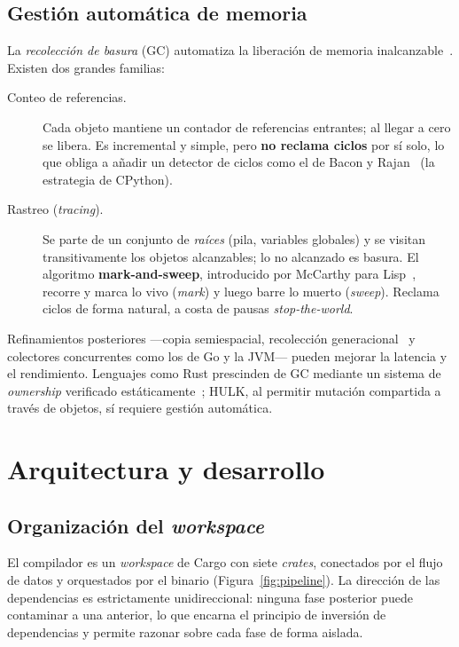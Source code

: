 \documentclass[14pts,runningheads,a4paper]{llncs}
\newcommand{\code}[1]{\texttt{\detokenize{#1}}}
\begin{document}
\subsection{Gesti\'on autom\'atica de memoria}

La \emph{recolecci\'on de basura} (GC) automatiza la liberaci\'on de memoria
inalcanzable~\cite{jones2011garbage}. Existen dos grandes familias:

\begin{description}
  \item[Conteo de referencias.] Cada objeto mantiene un contador de referencias
        entrantes; al llegar a cero se libera. Es incremental y simple, pero
        \textbf{no reclama ciclos} por s\'i solo, lo que obliga a a\~nadir un detector
        de ciclos como el de Bacon y Rajan~\cite{bacon2001recycler} (la estrategia
        de CPython).
  \item[Rastreo (\emph{tracing}).] Se parte de un conjunto de \emph{ra\'ices} (pila,
        variables globales) y se visitan transitivamente los objetos
        alcanzables; lo no alcanzado es basura. El algoritmo \textbf{mark-and-sweep},
        introducido por McCarthy para Lisp~\cite{mccarthy1960recursive,collins1960lisp},
        recorre y marca lo vivo (\emph{mark}) y luego barre lo muerto (\emph{sweep}).
        Reclama ciclos de forma natural, a costa de pausas \emph{stop-the-world}.
\end{description}

\noindent
Refinamientos posteriores ---copia semiespacial, recolecci\'on
generacional~\cite{jones1996garbage} y colectores concurrentes como los de Go y la
JVM--- pueden mejorar la latencia y el rendimiento. Lenguajes como Rust prescinden de GC mediante un sistema de
\emph{ownership} verificado est\'aticamente~\cite{klabnik2023rust}; HULK, al permitir
mutaci\'on compartida a trav\'es de objetos, s\'i requiere gesti\'on autom\'atica.

\section{Arquitectura y desarrollo}\label{sec:arquitectura}

\subsection{Organizaci\'on del \emph{workspace}}

El compilador es un \emph{workspace} de Cargo con siete \emph{crates}, conectados
por el flujo de datos \code{lexer -> ast <- parser -> semantic -> ir -> vm} y
orquestados por el binario \code{hulkc} (Figura~\ref{fig:pipeline}). La direcci\'on
de las dependencias es estrictamente unidireccional: ninguna fase posterior puede
contaminar a una anterior, lo que encarna el principio de inversi\'on de
dependencias y permite razonar sobre cada fase de forma aislada.
\end{document}
